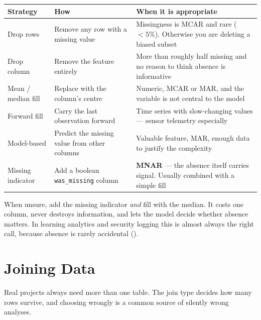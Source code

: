 \begin{longtable}{@{}L{3.3cm}L{4.6cm}L{6.6cm}@{}}
\toprule
{}
\textbf{Strategy} & \textbf{How} & \textbf{When it is appropriate} \\
\midrule
\endhead
Drop rows & Remove any row with a missing value & Missingness is MCAR and rare ($<5\%$). Otherwise you are deleting a biased subset \\
Drop column & Remove the feature entirely & More than roughly half missing and no reason to think absence is informative \\
Mean / median fill & Replace with the column's centre & Numeric, MCAR or MAR, and the variable is not central to the model \\
Forward fill & Carry the last observation forward & Time series with slow-changing values --- sensor telemetry especially \\
Model-based & Predict the missing value from other columns & Valuable feature, MAR, enough data to justify the complexity \\
Missing indicator & Add a boolean \texttt{was\_missing} column & \textbf{MNAR} --- the absence itself carries signal. Usually combined with a simple fill \\
\bottomrule
\end{longtable}

\begin{conceptbox}
When unsure, add the missing indicator \emph{and} fill with the median. It costs
one column, never destroys information, and lets the model decide whether absence
matters. In learning analytics and security logging this is almost always the
right call, because absence is rarely accidental ().
\end{conceptbox}

\section{Joining Data}

Real projects always need more than one table. The join type decides how many rows
survive, and choosing wrongly is a common source of silently wrong analyses.

